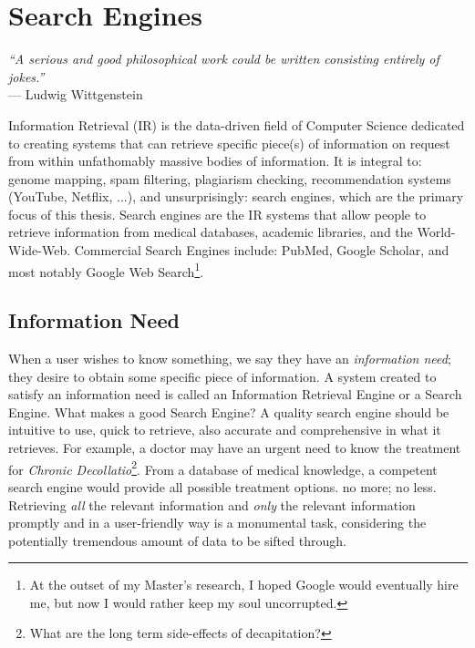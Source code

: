 \chapter{Search Engines} \label{chap:searchengines}

\begin{flushright}
    \textit{``A serious and good philosophical work could be written consisting entirely of jokes.''}
    \\ --- Ludwig Wittgenstein
\end{flushright}

Information Retrieval (IR) is the data-driven field of Computer Science dedicated to creating systems that can retrieve specific piece(s) of information on request from within unfathomably massive bodies of information. It is integral to: genome mapping, spam filtering, plagiarism checking, recommendation systems (YouTube, Netflix, ...), and unsurprisingly: search engines, which are the primary focus of this thesis. Search engines are the IR systems that allow people to retrieve information from medical databases, academic libraries, and the World-Wide-Web. Commercial Search Engines include: PubMed, Google Scholar, and most notably Google Web Search\footnote{At the outset of my Master's research, I hoped Google would eventually hire me, but now I would rather keep my soul uncorrupted.}.

\section{Information Need}
When a user wishes to know something, we say they have an \textit{information need}; they desire to obtain some specific piece of information. A system created to satisfy an information need is called an Information Retrieval Engine or a Search Engine. What makes a good Search Engine? A quality search engine should be intuitive to use, quick to retrieve, also accurate and comprehensive in what it retrieves. For example, a doctor may have an urgent need to know the treatment for \textit{Chronic Decollatio}\footnote{What are the long term side-effects of decapitation?}. From a database of medical knowledge, a competent search engine would provide all possible treatment options. no more; no less. Retrieving \textit{all} the relevant information and \textit{only} the relevant information promptly and in a user-friendly way is a monumental task, considering the potentially tremendous amount of data to be sifted through.

